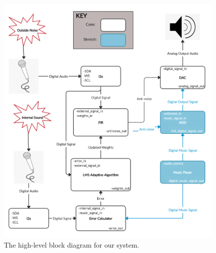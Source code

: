 \documentclass{fpgairpods}
\begin{document}
\begin{figure}
\includegraphics[width=\textwidth]{docs/proposal/figs/Proposal Block Diagram.png}
\caption{The high-level block diagram for our system.}
\label{fig:blockdiagram}
\end{figure}
\end{document}
